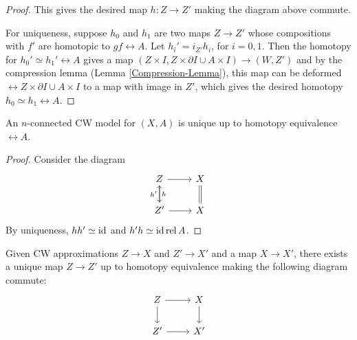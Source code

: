 \begin{proof}
    This gives the desired map
    $h \colon Z \to Z'$ making the
    diagram above commute.

    For uniqueness, suppose 
    $h_0$ and $h_1$ are two maps $Z \to Z'$ whose
    compositions with $f'$ are homotopic to
    $gf \rel A$. Let
    $h_i' = i_{Z'} h_i$, for $i=0,1$. Then
    the homotopy for $h_0' \simeq h_1' \rel A$ gives
    a map
    $\left( Z \times I, 
    Z \times \partial I \cup  A \times I\right) \to 
    \left( W,Z' \right) $ and by the compression lemma
    (Lemma \ref{Compression-Lemma}), this
    map can be deformed $\rel Z \times \partial I
    \cup A \times I$ to a map with image in
    $Z'$, which gives the desired homotopy $h_0 \simeq
    h_1 \rel A$.
\end{proof}

\begin{corollary}
    An $n$-connected CW model for $(X,A)$ is unique up to
    homotopy equivalence $\rel A$.
\end{corollary}

\begin{proof}
    Consider the diagram
    \begin{equation*}
    \begin{tikzcd}
        Z \ar[r] \ar[d, "h"] & X \ar[d, equal] \\
        Z' \ar[u, "h'"] \ar[r] & X
    \end{tikzcd}
    \end{equation*}
    By uniqueness, $h h' \simeq {\mathrm{id}}$ and
    $h' h \simeq {\mathrm{id}} \operatorname{rel} A$.
\end{proof}

\begin{corollary}
    Given CW approximations $Z \to X$ and $Z' \to X'$ and
    a map $X \to X'$, there exists a unique map
    $Z \to Z'$ up
    to homotopy equivalence making the following diagram
    commute:
    \begin{equation*}
    \begin{tikzcd}
        Z \ar[d] \ar[r] & X \ar[d] \\
        Z' \ar[r] & X'
    \end{tikzcd}
    \end{equation*}
    
\end{corollary}


